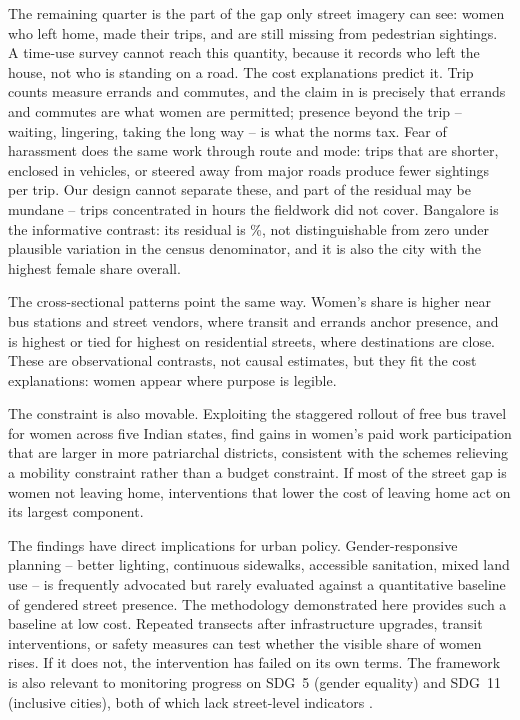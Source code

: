 \documentclass[12pt]{article}
\begin{document}
The remaining quarter is the part of the gap only street imagery can see: women who left home, made their trips, and are still missing from pedestrian sightings. A time-use survey cannot reach this quantity, because it records who left the house, not who is standing on a road. The cost explanations predict it. Trip counts measure errands and commutes, and the claim in \citet{phadke2011} is precisely that errands and commutes are what women are permitted; presence beyond the trip -- waiting, lingering, taking the long way -- is what the norms tax. Fear of harassment does the same work through route and mode: trips that are shorter, enclosed in vehicles, or steered away from major roads produce fewer sightings per trip. Our design cannot separate these, and part of the residual may be mundane -- trips concentrated in hours the fieldwork did not cover. Bangalore is the informative contrast: its residual is \BangaloreGapResidual\%, not distinguishable from zero under plausible variation in the census denominator, and it is also the city with the highest female share overall.

The cross-sectional patterns point the same way. Women's share is higher near bus stations and street vendors, where transit and errands anchor presence, and is highest or tied for highest on residential streets, where destinations are close. These are observational contrasts, not causal estimates, but they fit the cost explanations: women appear where purpose is legible.

The constraint is also movable. Exploiting the staggered rollout of free bus travel for women across five Indian states, \citet{rathore2026ticket} find gains in women's paid work participation that are larger in more patriarchal districts, consistent with the schemes relieving a mobility constraint rather than a budget constraint. If most of the street gap is women not leaving home, interventions that lower the cost of leaving home act on its largest component.

The findings have direct implications for urban policy. Gender-responsive planning -- better lighting, continuous sidewalks, accessible sanitation, mixed land use -- is frequently advocated but rarely evaluated against a quantitative baseline of gendered street presence. The methodology demonstrated here provides such a baseline at low cost. Repeated transects after infrastructure upgrades, transit interventions, or safety measures can test whether the visible share of women rises. If it does not, the intervention has failed on its own terms. The framework is also relevant to monitoring progress on SDG~5 (gender equality) and SDG~11 (inclusive cities), both of which lack street-level indicators \citep{un2016}.
\end{document}
